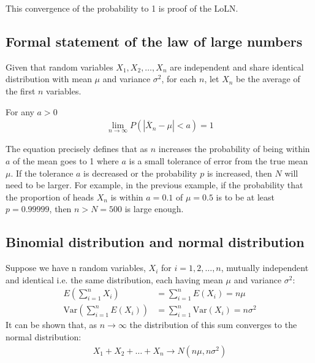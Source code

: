 \documentclass[10pt,a4paper]{article}
\begin{document}
This convergence of the probability to 1 is proof of the LoLN. 

\subsection{Formal statement of the law of large numbers}

Given that random variables $X_1,X_2,\dots,X_n$ are independent and share identical distribution
with mean $\mu$ and variance $\sigma^2$, for each $n$, let $X_n$ be the average of the first $n$ variables.

\begin{tcolorbox}[breakable,colback=white]
	For any $a >0$
	\begin{align*}
		\lim_{n \rightarrow \infty} P(|\overline{X}_n - \mu|<a) = 1
	\end{align*}
\end{tcolorbox}

The equation precisely defines that as $n$ increases the probability of being within $a$ of the mean
goes to 1 where $a$ is a small tolerance of error from the true mean $\mu$. If the tolerance $a$ is
decreased or the probability $p$ is increased, then $N$ will need to be larger. For example, in the
previous example, if the probability that the proportion of heads $X_n$ is within $a= 0.1$ of
$\mu=0.5$ is to be at least $p= 0.99999$, then $n > N=500$ is large enough.

\subsection{Binomial distribution and normal distribution}

Suppose we have n random variables, $X_i$ for $i = 1, 2,\dots, n$, mutually independent and
identical i.e. the same distribution, each having mean $\mu$ and variance $\sigma^2$:
\begin{align*}
	E\left(\sum_{i=1}^n X_i\right) &= \sum_{i=1}^n E(X_i) = n\mu \\
	\text{Var}\left(\sum_{i=1}^n E(X_i)\right) &= \sum_{i=1}^n \text{Var}(X_i) = n\sigma^2
\end{align*}
It can be shown that, as $n \rightarrow \infty$ the distribution of this sum converges to the normal
distribution:
\begin{align*}
	X_1 + X_2 + \dots + X_n \rightarrow N(n\mu, n\sigma^2) 
\end{align*}
\end{document}
